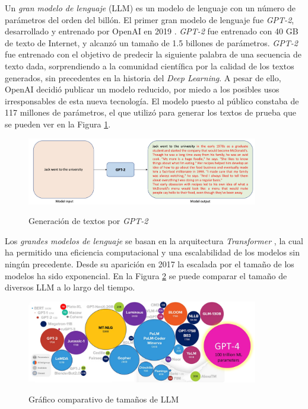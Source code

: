 Un \textit{gran modelo de lenguaje} (LLM) es un modelo de lenguaje con un número de parámetros del orden del billón. El primer gran modelo de lenguaje fue \textit{GPT-2}, desarrollado y entrenado por OpenAI en 2019 \citep{radfordLanguageModelsAre2019a}. \textit{GPT-2} fue entrenado con 40 GB de texto de Internet, y alcanzó un tamaño de 1.5 billones de parámetros. \textit{GPT-2} fue entrenado con el objetivo de predecir la siguiente palabra de una secuencia de texto dada, sorprendiendo a la comunidad científica por la calidad de los textos generados, sin precedentes en la historia del \textit{Deep Learning}. A pesar de ello, OpenAI decidió publicar un modelo reducido, por miedo a los posibles usos irresponsables de esta nueva tecnología. El modelo puesto al público constaba de 117 millones de parámetros, el que utilizó para generar los textos de prueba que se pueden ver en la Figura \ref{fig:gpt2_text_generation}. 

\begin{figure}[]
    \caption{Generación de textos por \textit{GPT-2}}
    \centering
    \includegraphics[width=0.9\textwidth]{./figuras/GPT2_text_generation.png}
    \label{fig:gpt2_text_generation}
\end{figure}

Los \textit{grandes modelos de lenguaje} se basan en la arquitectura \textit{Transformer} \citep{vaswaniAttentionAllYou2017}, la cual ha permitido una eficiencia computacional y una escalabilidad de los modelos sin ningún precedente. Desde su aparición en 2017 la escalada por el tamaño de los modelos ha sido exponencial. En la Figura \ref{fig:llm_sizes} se puede comparar el tamaño de diversos LLM a lo largo del tiempo.

\begin{figure}[]
    \caption{Gráfico comparativo de tamaños de LLM}
    \centering
    \includegraphics[width=0.9\textwidth]{./figuras/LLMs_sizes.png}
    \label{fig:llm_sizes}
\end{figure}

